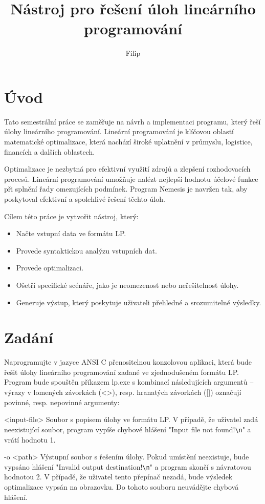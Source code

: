 \documentclass[czech, sem, kiv, he, pdf, viewonly]{fasthesis}
\title{Nástroj pro řešení úloh lineárního programování}
\author{Filip}{Nehéz}{}{}
\begin{document}
\frontpages[notm]
\tableofcontents
%
%
%
%
%
%
\chapter{Úvod}
Tato semestrální práce se zaměřuje na návrh a implementaci programu, který řeší úlohy lineárního programování. Lineární programování je klíčovou oblastí matematické optimalizace, která nachází široké uplatnění v průmyslu, logistice, financích a dalších oblastech.

Optimalizace je nezbytná pro efektivní využití zdrojů a zlepšení rozhodovacích procesů. Lineární programování umožňuje nalézt nejlepší hodnotu účelové funkce při splnění řady omezujících podmínek. Program Nemesis je navržen tak, aby poskytoval efektivní a spolehlivé řešení těchto úloh.

Cílem této práce je vytvořit nástroj, který:
\begin{itemize}
    \item Načte vstupní data ve formátu LP.
    \item Provede syntaktickou analýzu vstupních dat.
    \item Provede optimalizaci.
    \item Ošetří specifické scénáře, jako je neomezenost nebo neřešitelnost úlohy.
    \item Generuje výstup, který poskytuje uživateli přehledné a srozumitelné výsledky.
\end{itemize}
%
%
%
%
%
%
\chapter{Zadání}
Naprogramujte v jazyce ANSI C přenositelnou konzolovou aplikaci, která bude řešit úlohy lineárního programování zadané ve zjednodušeném formátu LP.
Program bude spouštěn příkazem lp.exe s kombinací následujících argumentů – výrazy v lomených závorkách (<>), resp. hranatých závorkách ([]) označují povinné, resp. nepovinné argumenty:

<input-file> Soubor s popisem úlohy ve formátu LP. V případě, že uživatel zadá neexistující soubor, program vypíše chybové hlášení "Input file not found!\verb|\n|"
a vrátí hodnotu 1.

-o <path> Výstupní soubor s řešením úlohy. Pokud umístění neexistuje, bude vypsáno hlášení "Invalid output destination!\verb|\n|" a program skončí s návratovou hodnotou 2. V případě, že uživatel tento přepínač nezadá, bude výsledek optimalizace vypsán na obrazovku. Do tohoto souboru neuvádějte chybová hlášení.
\end{document}
